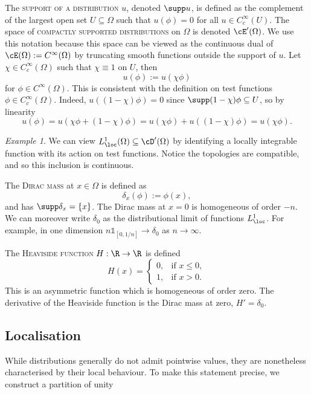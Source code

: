 \documentclass[reqno]{amsart}
\theoremstyle{definition}
\theoremstyle{remark}
\newtheorem*{example}{Example}
\renewcommand{\emph}{\textsc}
\begin{document}
The \emph{support of a distribution} $u$, denoted $\supp u$, is defined as the complement of the largest open set $U \subseteq \Omega$ such that $u(\phi) = 0$ for all $u \in C^\infty_c (U)$. The space of \emph{compactly supported distributions} on $\Omega$ is denoted $\cE' (\Omega)$. We use this notation because this space can be viewed as the continuous dual of $\cE (\Omega) := C^\infty (\Omega)$ by truncating smooth functions outside the support of $u$. Let $\chi \in C^\infty_c (\Omega)$ such that $\chi \equiv 1$ on $U$, then  
	\[ u(\phi) :=  u(\chi \phi) \]
for $\phi \in C^\infty (\Omega)$. This is consistent with the definition on test functions $\phi \in C^\infty_c (\Omega)$. Indeed, $u((1 - \chi)\phi) = 0$ since $\supp (1 - \chi)\phi \subseteq U$, so by linearity
	\[ u(\phi) = u(\chi \phi + (1 - \chi)\phi) = u (\chi\phi) + u((1 - \chi)\phi) = u (\chi \phi). \]

\begin{example}
	\item We can view $L^1_\loc (\Omega) \subseteq \cD' (\Omega)$ by identifying a locally integrable function with its action on test functions. Notice the topologies are compatible, and so this inclusion is continuous. 
	\item The \emph{Dirac mass} at $x \in \Omega$ is defined as 
				\[ \delta_x (\phi) := \phi(x), \]
			and has $\supp \delta_x = \{x\}$. The Dirac mass at $x = 0$ is homogeneous of order $-n$. We can moreover write $\delta_0$ as the distributional limit of functions $L^1_{\loc}$. For example, in one dimension $n \mathbb 1_{[0, 1/n]} \to \delta_0$ as $n \to \infty$. 
	
	\item The \emph{Heaviside function} $H: \R \to \R$ is defined 
				\[
					H(x)
						=
						\begin{cases}
							0, 		&\text{if } x \leq 0, \\
							1, 		&\text{if } x > 0.
						\end{cases}
				\]			
			This is an asymmetric function which is homogeneous of order zero. The derivative of the Heaviside function is the Dirac mass at zero, $H' = \delta_0$. 				
\end{example} 


\subsection{Localisation}

While distributions generally do not admit pointwise values, they are nonetheless characterised by their local behaviour. To make this statement precise, we construct a partition of unity
\end{document}

